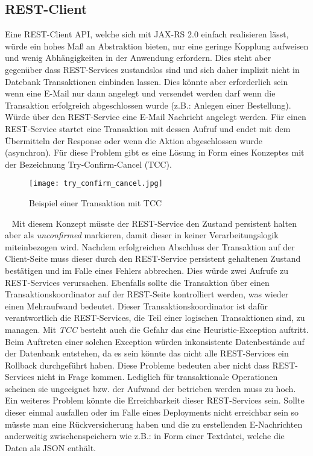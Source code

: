 \subsection{REST-Client}
Eine REST-Client API, welche sich mit JAX-RS 2.0 einfach realisieren lässt, würde ein hohes Maß an Abstraktion bieten, nur eine geringe Kopplung aufweisen und wenig Abhängigkeiten in der Anwendung erfordern. Dies steht aber gegenüber dass REST-Services zustandslos sind und sich daher implizit nicht in Datebank 
Transaktionen einbinden lassen. Dies könnte aber erforderlich sein wenn eine E-Mail nur dann angelegt und versendet werden darf wenn die Transaktion erfolgreich abgeschlossen wurde (z.B.: Anlegen einer Bestellung). Würde über den REST-Service eine E-Mail Nachricht angelegt werden. Für einen REST-Service startet eine Transaktion mit dessen Aufruf und endet mit dem Übermitteln der Response oder wenn die Aktion abgeschlossen wurde (asynchron).
\newpage
Für diese Problem gibt es eine Lösung in Form eines Konzeptes mit der Bezeichnung Try-Confirm-Cancel (TCC).
\begin{figure}[h]
\centering
\texttt{[image: try\_confirm\_cancel.jpg]} %
\caption{Beispiel einer Transaktion mit TCC}
\label{fig:clevermail-rest-tcc}
\end{figure}
\ \newline
Mit diesem Konzept müsste der REST-Service den Zustand persistent halten aber als \emph{unconfirmed} markieren, damit dieser in keiner Verarbeitungslogik miteinbezogen wird. Nachdem erfolgreichen Abschluss der Transaktion auf der Client-Seite muss dieser durch den REST-Service persistent gehaltenen Zustand bestätigen und im Falle eines Fehlers abbrechen. Dies würde zwei Aufrufe zu REST-Services verursachen. Ebenfalls sollte die Transaktion über einen Transaktionskoordinator auf der REST-Seite kontrolliert werden, was wieder einen Mehraufwand bedeutet. Dieser Transaktionskoordinator ist dafür verantwortlich die REST-Services, die Teil einer logischen Transaktionen sind,  zu managen. Mit \emph{TCC} besteht auch die Gefahr das eine Heuristic-Exception auftritt. Beim Auftreten einer solchen Exception würden inkonsistente Datenbestände auf der Datenbank entstehen, da es sein könnte das nicht alle REST-Services ein Rollback durchgeführt haben.
\newline
\newline
Diese Probleme bedeuten aber nicht dass REST-Services nicht in Frage kommen. Lediglich für transaktionale Operationen scheinen sie ungeeignet bzw. der Aufwand der betrieben werden muss zu hoch. Ein weiteres Problem könnte die Erreichbarkeit dieser REST-Services sein. Sollte dieser einmal ausfallen oder im Falle eines Deployments nicht erreichbar sein so müsste man eine Rückversicherung haben und die zu erstellenden E-Nachrichten anderweitig zwischenspeichern wie z.B.: in Form einer Textdatei, welche die Daten als JSON enthält.
\newpage
